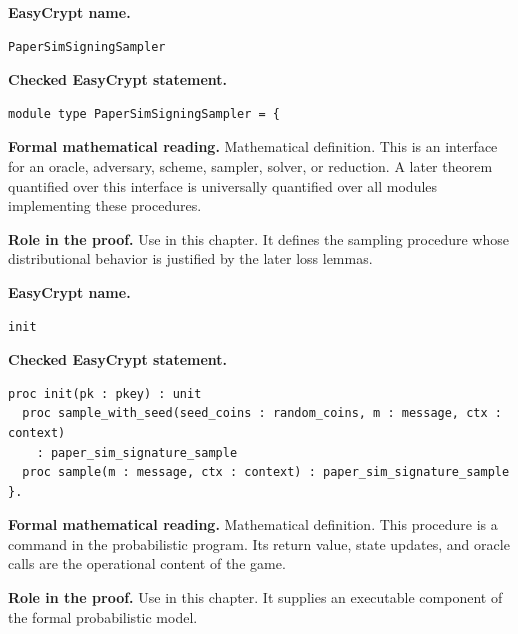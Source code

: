 \begin{formaldefinition}
\noindent\textbf{EasyCrypt name.}
\begin{lstlisting}[language=EasyCrypt,basicstyle=\ttfamily\scriptsize]
PaperSimSigningSampler
\end{lstlisting}
\noindent\textbf{Checked EasyCrypt statement.}
\begin{lstlisting}[language=EasyCrypt,basicstyle=\ttfamily\scriptsize]
module type PaperSimSigningSampler = {
\end{lstlisting}
\noindent\textbf{Formal mathematical reading.}
Mathematical definition. This is an interface for an oracle, adversary, scheme, sampler, solver, or reduction.  A later theorem quantified over this interface is universally quantified over all modules implementing these procedures.

\noindent\textbf{Role in the proof.}
Use in this chapter. It defines the sampling procedure whose distributional behavior is justified by the later loss lemmas.

\end{formaldefinition}

\begin{formaldefinition}
\noindent\textbf{EasyCrypt name.}
\begin{lstlisting}[language=EasyCrypt,basicstyle=\ttfamily\scriptsize]
init
\end{lstlisting}
\noindent\textbf{Checked EasyCrypt statement.}
\begin{lstlisting}[language=EasyCrypt,basicstyle=\ttfamily\scriptsize]
proc init(pk : pkey) : unit
  proc sample_with_seed(seed_coins : random_coins, m : message, ctx : context)
    : paper_sim_signature_sample
  proc sample(m : message, ctx : context) : paper_sim_signature_sample
}.
\end{lstlisting}
\noindent\textbf{Formal mathematical reading.}
Mathematical definition. This procedure is a command in the probabilistic program.  Its return value, state updates, and oracle calls are the operational content of the game.

\noindent\textbf{Role in the proof.}
Use in this chapter. It supplies an executable component of the formal probabilistic model.

\end{formaldefinition}

